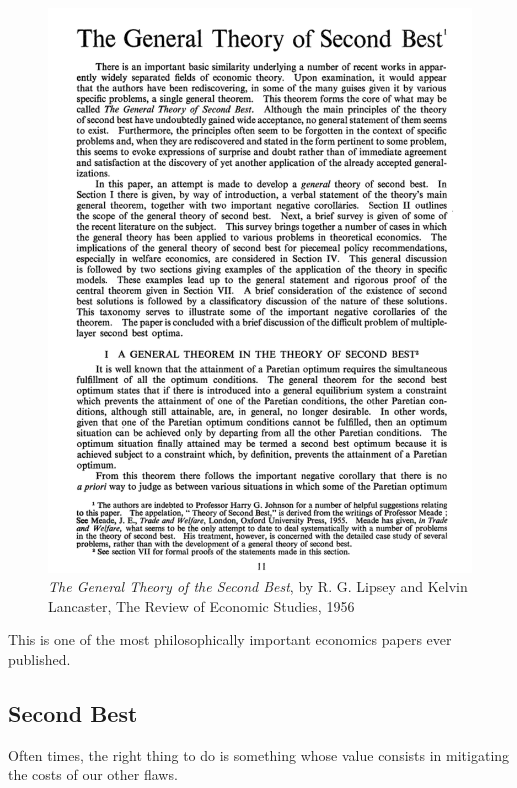 \documentclass[
  letterpaper,
  DIV=11,
  numbers=noendperiod]{scrartcl}
\begin{document}
\begin{figure}[H]

{\centering \includegraphics{lipsey.png}

}

\caption{\emph{The General Theory of the Second Best}, by R. G. Lipsey
and Kelvin Lancaster, The Review of Economic Studies, 1956}

\end{figure}%

This is one of the most philosophically important economics papers ever
published.

\subsection{Second Best}\label{second-best}

Often times, the right thing to do is something whose value consists in
mitigating the costs of our other flaws.
\end{document}

